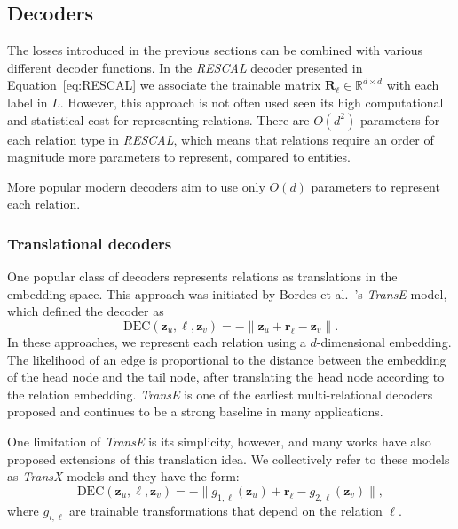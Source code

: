 \subsection{Decoders}
The losses introduced in the previous sections can be combined with various different decoder functions. In the \textit{RESCAL} decoder presented in Equation~\eqref{eq:RESCAL} we associate the trainable matrix $\mathbf{R}_\ell\in\mathbb{R}^{d\times d}$ with each label in $L$. However, this approach is not often used seen its high computational and statistical cost for representing relations. There are $O(d^2)$ parameters for each relation type in \textit{RESCAL}, which means that relations require an order of magnitude more parameters to represent, compared to entities.

More popular modern decoders aim to use only $O(d)$ parameters to represent each relation. 

\subsubsection{Translational decoders}
One popular class of decoders represents relations as translations in the embedding space. This approach was initiated by Bordes et al.~\cite{Bordes2013TransE}'s \textit{TransE} model, which defined the decoder as
\begin{equation*}
    \text{DEC}(\mathbf{z}_u, \ell, \mathbf{z}_v) = -\|\mathbf{z}_u + \mathbf{r}_\ell - \mathbf{z}_v\|.
\end{equation*}
In these approaches, we represent each relation using a $d$-dimensional embedding. The likelihood of an edge is proportional to the distance between the embedding of the head node and the tail node, after translating the head node according to the relation embedding. \textit{TransE} is one of the earliest multi-relational decoders proposed and continues to be a strong baseline in many applications.

One limitation of \textit{TransE} is its simplicity, however, and many works have also proposed extensions of this translation idea. We collectively refer to these models as \textit{TransX} models and they have the form:
\begin{equation*}
    \text{DEC}(\mathbf{z}_u, \ell, \mathbf{z}_v) = -\|g_{1,\ell}(\mathbf{z}_u) + \mathbf{r}_\ell - g_{2,\ell}(\mathbf{z}_v)\|,
\end{equation*}
where $g_{i,\ell}$ are trainable transformations that depend on the relation $\ell$.


